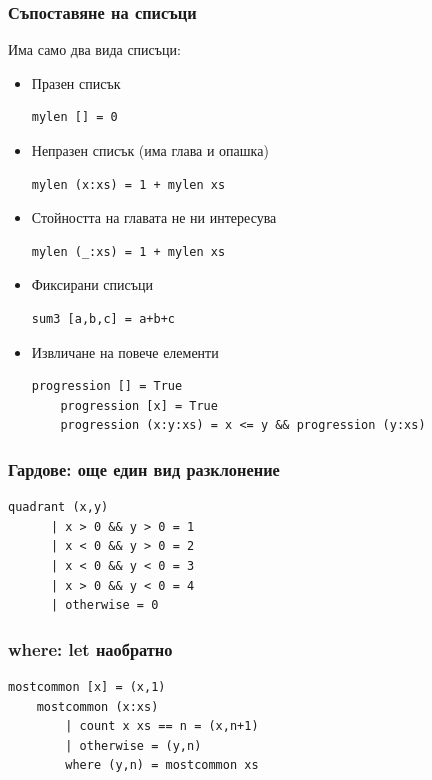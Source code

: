 \documentclass{beamer}
\begin{document}
\begin{frame}[fragile]
  \frametitle{Съпоставяне на списъци}

  Има само два вида списъци:
\begin{itemize}
  \item Празен списък
  \begin{lstlisting}[basicstyle=\small]
    mylen [] = 0
  \end{lstlisting}
  \item Непразен списък (има глава и опашка)
  \begin{lstlisting}[basicstyle=\small]
    mylen (x:xs) = 1 + mylen xs
  \end{lstlisting}
  \item Стойността на главата не ни интересува
  \begin{lstlisting}[basicstyle=\small]
    mylen (_:xs) = 1 + mylen xs
  \end{lstlisting}
  \item Фиксирани списъци
  \begin{lstlisting}[basicstyle=\small]
    sum3 [a,b,c] = a+b+c
  \end{lstlisting}
  \item Извличане на повече елементи
  \begin{lstlisting}[basicstyle=\small]
    progression [] = True
    progression [x] = True
    progression (x:y:xs) = x <= y && progression (y:xs)
  \end{lstlisting}
 
\end{itemize}

\end{frame}


\begin{frame}[fragile]
  \frametitle{Гардове: още един вид разклонение}

  \begin{lstlisting}[basicstyle=\small]
    quadrant (x,y) 
      | x > 0 && y > 0 = 1
      | x < 0 && y > 0 = 2
      | x < 0 && y < 0 = 3
      | x > 0 && y < 0 = 4
      | otherwise = 0
  \end{lstlisting}


\end{frame}


\begin{frame}[fragile]
  \frametitle{where: let наобратно}
  \begin{lstlisting}[basicstyle=\small]
    mostcommon [x] = (x,1)
    mostcommon (x:xs) 
        | count x xs == n = (x,n+1)
        | otherwise = (y,n)
        where (y,n) = mostcommon xs    
  \end{lstlisting}
\end{frame}
\end{document}
